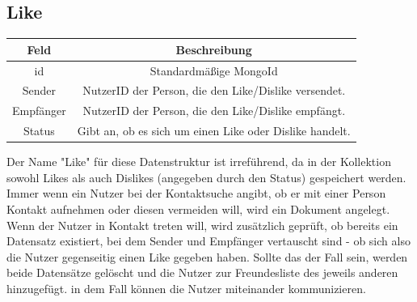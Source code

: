 \subsection{Like}
\begin{center}
    \begin{tabular}{ |c|c| }
        \hline
        Feld & Beschreibung  \\
        \hline
        id & Standardmäßige MongoId \\
        Sender & NutzerID der Person, die den Like/Dislike versendet. \\
        Empfänger &  NutzerID der Person, die den Like/Dislike empfängt. \\
        Status & Gibt an, ob es sich um einen Like oder Dislike handelt. \\
        \hline
    \end{tabular}
    \cite{DB3} \cite{DB4}
\end{center}

Der Name "Like" für diese Datenstruktur ist irreführend, da in der Kollektion sowohl Likes als auch Dislikes (angegeben durch den Status) gespeichert werden.
Immer wenn ein Nutzer bei der Kontaktsuche angibt, ob er mit einer Person Kontakt aufnehmen oder diesen vermeiden will, wird ein Dokument angelegt. Wenn der Nutzer in Kontakt treten will, wird zusätzlich geprüft, ob bereits ein Datensatz existiert, bei dem Sender und Empfänger vertauscht sind - ob sich also die Nutzer gegenseitig einen Like gegeben haben. Sollte das der Fall sein, werden beide Datensätze gelöscht und die Nutzer zur Freundesliste des jeweils anderen hinzugefügt. in dem Fall können die Nutzer miteinander kommunizieren.

